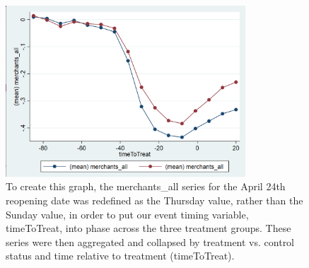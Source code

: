 \documentclass[12pt,letterpaper]{article}
\begin{document}
        \begin{figure}[!ht]
          \centering
          \includegraphics[width=0.8\textwidth]{figures/merchants_all_graph.png}
\caption{To create this graph, the merchants\_all series for the April 24th reopening date was redefined as the Thursday value, rather than the Sunday value, in order to put our event timing variable, timeToTreat, into phase across the three treatment groups.  These series were then aggregated and collapsed by treatment vs. control status and time relative to treatment (timeToTreat).}
          \label{fig:figures-merchants_all_graph-png}
        \end{figure}
        \clearpage
\end{document}
